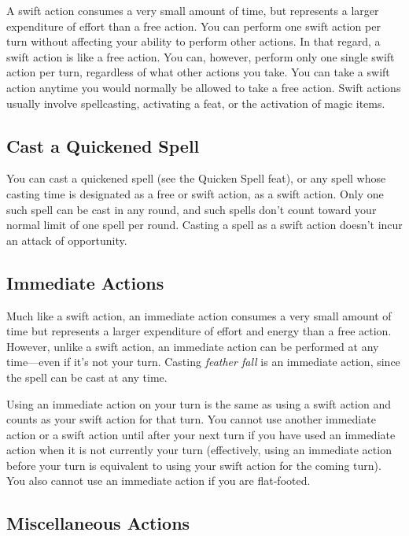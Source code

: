 				
A swift action consumes a very small amount of time, but represents a larger expenditure of effort than a free action. You can perform one swift action per turn without affecting your ability to perform other actions. In that regard, a swift action is like a free action. You can, however, perform only one single swift action per turn, regardless of what other actions you take. You can take a swift action anytime you would normally be allowed to take a free action. Swift actions usually involve spellcasting, activating a feat, or the activation of magic items.
				
\subsection{Cast a Quickened Spell}

				
You can cast a quickened spell (see the Quicken Spell feat), or any spell whose casting time is designated as a free or swift action, as a swift action. Only one such spell can be cast in any round, and such spells don't count toward your normal limit of one spell per round. Casting a spell as a swift action doesn't incur an attack of opportunity.
				
\subsection{Immediate Actions}

				
Much like a swift action, an immediate action consumes a very small amount of time but represents a larger expenditure of effort and energy than a free action. However, unlike a swift action, an immediate action can be performed at any time---even if it's not your turn. Casting \textit{feather fall} is an immediate action, since the spell can be cast at any time.
				
Using an immediate action on your turn is the same as using a swift action and counts as your swift action for that turn. You cannot use another immediate action or a swift action until after your next turn if you have used an immediate action when it is not currently your turn (effectively, using an immediate action before your turn is equivalent to using your swift action for the coming turn). You also cannot use an immediate action if you are flat-footed.
				
\subsection{Miscellaneous Actions}

